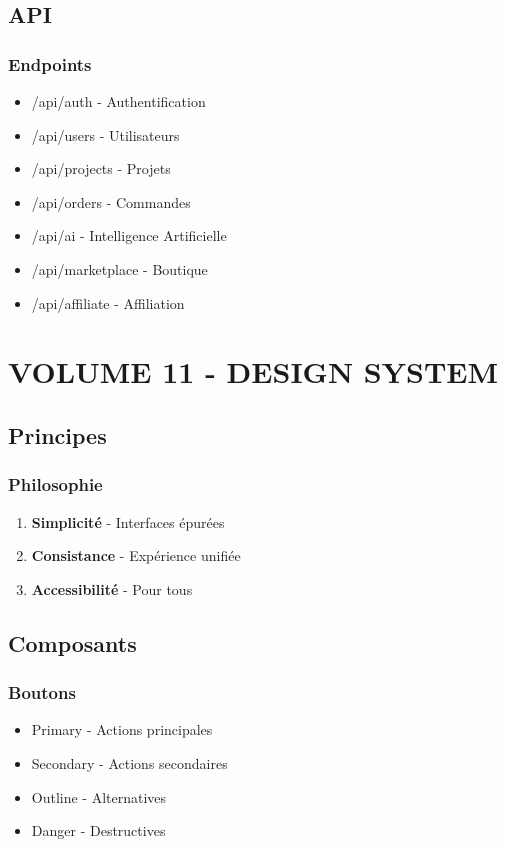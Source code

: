 \documentclass[12pt,a4paper,oneside]{book}
\begin{document}
\chapter{API}

\section{Endpoints}
\begin{itemize}
\item /api/auth - Authentification
\item /api/users - Utilisateurs
\item /api/projects - Projets
\item /api/orders - Commandes
\item /api/ai - Intelligence Artificielle
\item /api/marketplace - Boutique
\item /api/affiliate - Affiliation
\end{itemize}

\part{VOLUME 11 - DESIGN SYSTEM}

\chapter{Principes}

\section{Philosophie}
\begin{enumerate}
\item \textbf{Simplicité} - Interfaces épurées
\item \textbf{Consistance} - Expérience unifiée
\item \textbf{Accessibilité} - Pour tous
\end{enumerate}

\chapter{Composants}

\section{Boutons}
\begin{itemize}
\item Primary - Actions principales
\item Secondary - Actions secondaires
\item Outline - Alternatives
\item Danger - Destructives
\end{itemize}
\end{document}
